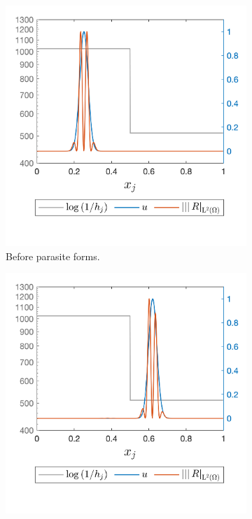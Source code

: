 \documentclass[final]{amsart}
\numberwithin{equation}{section}
\begin{document}
\begin{figure}[H]
  \centering
  \begin{subfigure}[b]{.3\textwidth}
    \includegraphics[width=\textwidth]{../figures/fig_CNCS_parasite_rep_20_zoom_off}	
    \caption{
      \label{fig:CNCS_parasite_1D_1}
      Before parasite forms.
    }
  \end{subfigure}
  \begin{subfigure}[b]{.3\textwidth}
    \includegraphics[width=\textwidth]{../figures/fig_CNCS_parasite_rep_3800zoom_off}	

\end{subfigure}
\end{figure}
\end{document}
